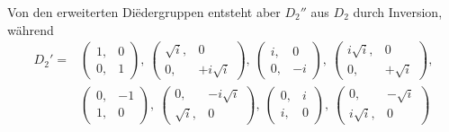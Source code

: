 Von den erweiterten Di\"edergruppen entsteht aber $D_2''$ aus $D_2$ durch Inversion, während
\[
\begin{aligned}
D_2' = &\begin{pmatrix}1, & 0\\ 0, & 1\end{pmatrix},\ \begin{pmatrix}\sqrt{i}, & 0\\ 0, & +i\sqrt{i}\end{pmatrix},\ \begin{pmatrix}i, & 0\\ 0, & -i\end{pmatrix},\ \begin{pmatrix}i\sqrt{i}, & 0\\ 0, & +\sqrt{i}\end{pmatrix},\\
&\begin{pmatrix}0, & -1\\ 1, & 0\end{pmatrix},\ \begin{pmatrix}0, & -i\sqrt{i}\\ \sqrt{i}, & 0\end{pmatrix},\ \begin{pmatrix}0, & i\\ i, & 0\end{pmatrix},\ \begin{pmatrix}0, & -\sqrt{i}\\ i\sqrt{i}, & 0\end{pmatrix}
\end{aligned}
\]
